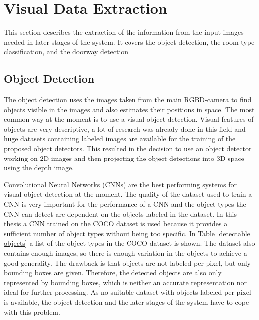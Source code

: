 \section{Visual Data Extraction} %

This section describes the extraction of the information from the input images needed in later stages of the system. It covers the object detection, the room type classification, and the doorway detection.

\subsection{Object Detection} %

The object detection uses the images taken from the main RGBD-camera to find objects visible in the images and also estimates their positions in space. The most common way at the moment is to use a visual object detection. Visual features of objects are very descriptive, a lot of research was already done in this field and huge datasets containing labeled images are available for the training of the proposed object detectors. This resulted in the decision to use an object detector working on 2D images and then projecting the object detections into 3D space using the depth image. 

Convolutional Neural Networks (CNNs) are the best performing systems for visual object detection at the moment. The quality of the dataset used to train a CNN is very important for the performance of a CNN and the object types the CNN can detect are dependent on the objects labeled in the dataset. In this thesis a CNN trained on the COCO dataset is used because it provides a sufficient number of object types without being too specific. In Table \ref{detectable objects} a list of the object types in the COCO-dataset is shown. The dataset also contains enough images, so there is enough variation in the objects to achieve a good generality. The drawback is that objects are not labeled per pixel, but only bounding boxes are given. Therefore, the detected objects are also only represented by bounding boxes, which is neither an accurate representation nor ideal for further processing. As no suitable dataset with objects labeled per pixel is available, the object detection and the later stages of the system have to cope with this problem. 

